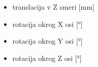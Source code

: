 \documentclass[letterpaper,10pt,english]{sphinxmanual}
\begin{document}
\begin{itemize}
\begin{description}
\begin{itemize}
\item {} 
\sphinxAtStartPar
{}             translacija v Z smeri   {[}mm{]}

\item {} 
\sphinxAtStartPar
{}             rotacija okrog X osi    {[}°{]}

\item {} 
\sphinxAtStartPar
{}             rotacija okrog Y osi    {[}°{]}

\item {} 
\sphinxAtStartPar
{}             rotacija okrog Z osi    {[}°{]}

\end{itemize}

\end{description}

\end{itemize}
\end{document}
